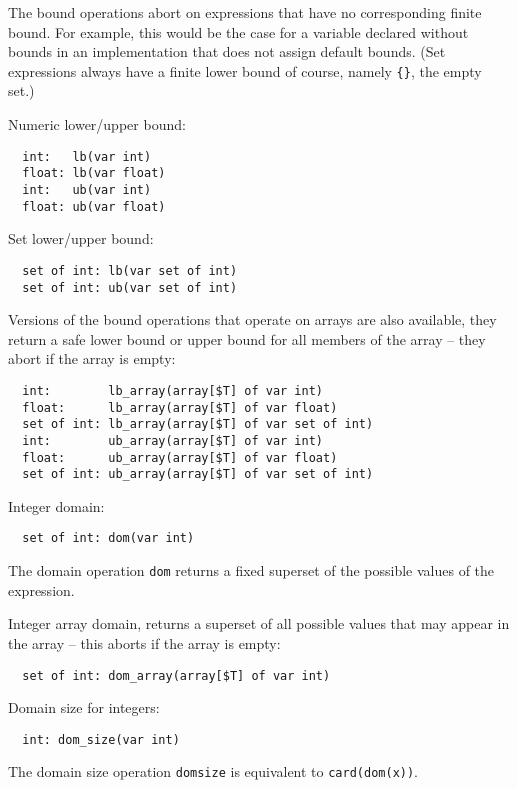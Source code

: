 \documentclass[10pt]{scrartcl}
\newcommand{\pjs}[1]{\textcolor{blue}{PJS:#1}}
\begin{document}
The bound operations abort on expressions that have no corresponding finite bound.
For example, this would be the case for a variable declared without bounds
in an implementation that does not assign default bounds.
(Set expressions always have a finite lower bound of course,
namely \texttt{\{\}}, the empty set.)


\vspace{2mm}



\builtin{}
Numeric lower/upper bound:
\begin{verbatim}
  int:   lb(var int)
  float: lb(var float)
  int:   ub(var int)
  float: ub(var float)
\end{verbatim}

\builtin{}
Set lower/upper bound:
\begin{verbatim}
  set of int: lb(var set of int)
  set of int: ub(var set of int)
\end{verbatim}

\builtin{}
Versions of the bound operations that operate on arrays are also available,
they return a safe lower bound or upper bound for all members of the array
 -- they abort if the array is empty:
\begin{verbatim}
  int:        lb_array(array[$T] of var int)
  float:      lb_array(array[$T] of var float)
  set of int: lb_array(array[$T] of var set of int)
  int:        ub_array(array[$T] of var int)
  float:      ub_array(array[$T] of var float)
  set of int: ub_array(array[$T] of var set of int)
\end{verbatim}

\builtin{}
Integer domain:
\begin{verbatim}
  set of int: dom(var int)
\end{verbatim}
The domain operation \texttt{dom} returns a fixed superset
of the possible values of the expression.

\builtin{}
Integer array domain, returns a superset of all possible values that may
appear in the array -- this aborts if the array is empty:
\begin{verbatim}
  set of int: dom_array(array[$T] of var int)
\end{verbatim}

\builtin{}
Domain size for integers:
\begin{verbatim}
  int: dom_size(var int)
\end{verbatim}
The domain size operation \texttt{dom\n{}size} is equivalent
to \texttt{card(dom(x))}.
\end{document}
